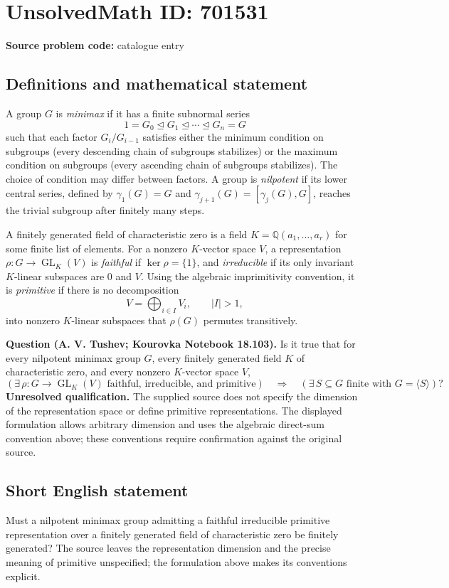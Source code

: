 \documentclass[11pt]{article}
\newcommand{\Q}{\mathbb{Q}}
\begin{document}
\section*{UnsolvedMath ID: 701531}
\textbf{Source problem code:} catalogue entry
\subsection{Definitions and mathematical statement}
A group \(G\) is \emph{minimax} if it has a finite subnormal series
\[
1=G_0\trianglelefteq G_1\trianglelefteq\cdots\trianglelefteq G_n=G
\]
such that each factor \(G_i/G_{i-1}\) satisfies either the minimum condition on subgroups (every descending chain of subgroups stabilizes) or the maximum condition on subgroups (every ascending chain of subgroups stabilizes). The choice of condition may differ between factors. A group is \emph{nilpotent} if its lower central series, defined by \(\gamma_1(G)=G\) and \(\gamma_{j+1}(G)=[\gamma_j(G),G]\), reaches the trivial subgroup after finitely many steps.

A finitely generated field of characteristic zero is a field \(K=\Q(a_1,\ldots,a_r)\) for some finite list of elements. For a nonzero \(K\)-vector space \(V\), a representation \(\rho:G\to\operatorname{GL}_K(V)\) is \emph{faithful} if \(\ker\rho=\{1\}\), and \emph{irreducible} if its only invariant \(K\)-linear subspaces are \(0\) and \(V\). Using the algebraic imprimitivity convention, it is \emph{primitive} if there is no decomposition
\[
V=\bigoplus_{i\in I}V_i,\qquad |I|>1,
\]
into nonzero \(K\)-linear subspaces that \(\rho(G)\) permutes transitively.

\textbf{Question (A. V. Tushev; Kourovka Notebook 18.103).} Is it true that for every nilpotent minimax group \(G\), every finitely generated field \(K\) of characteristic zero, and every nonzero \(K\)-vector space \(V\),
\[
\left(\exists\,\rho:G\longrightarrow\operatorname{GL}_K(V)\text{ faithful, irreducible, and primitive}\right)
\quad\Longrightarrow\quad
\left(\exists\,S\subseteq G\text{ finite with }G=\langle S\rangle\right)?
\]
\textbf{Unresolved qualification.} The supplied source does not specify the dimension of the representation space or define primitive representations. The displayed formulation allows arbitrary dimension and uses the algebraic direct-sum convention above; these conventions require confirmation against the original source.
\subsection{Short English statement}
Must a nilpotent minimax group admitting a faithful irreducible primitive representation over a finitely generated field of characteristic zero be finitely generated? The source leaves the representation dimension and the precise meaning of primitive unspecified; the formulation above makes its conventions explicit.
\end{document}
